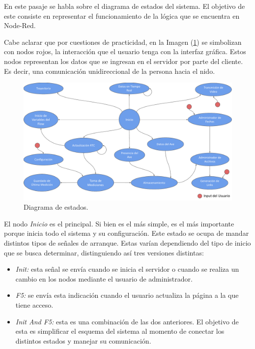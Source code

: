 En este pasaje se habla sobre el diagrama de estados del sistema. El objetivo de este consiste en representar el funcionamiento de la lógica que se encuentra en Node-Red.

Cabe aclarar que por cuestiones de practicidad, en la Imagen (\ref{fig:diagrama_de_estados}) se simbolizan con nodos rojos, la interacción que el usuario tenga con la interfaz gráfica. Estos nodos representan los datos que se ingresan en el servidor por parte del cliente. Es decir, una comunicación unidireccional de la persona hacia el nido.

\begin{figure}[H]
	\centering	
	\includegraphics[width=\textwidth, page=1]{ImagenesIngenieria de Detalle/FlowChartNodeRed.pdf}	
	\caption{Diagrama de estados.}
	\label{fig:diagrama_de_estados}
\end{figure}

El nodo \textit{Inicio} es el principal. Si bien es el más simple, es el más importante porque inicia todo el sistema y su configuración. Este estado se ocupa de mandar distintos tipos de señales de arranque. Estas varían dependiendo del tipo de inicio que se busca determinar, distinguiendo así tres versiones distintas:
\begin{itemize}
	\item \textit{Init:} esta señal se envía cuando se inicia el servidor o cuando se realiza un cambio en los nodos mediante el usuario de administrador.
	\item \textit{F5:} se envía esta indicación cuando el usuario actualiza la página a la que tiene acceso.
	\item \textit{Init And F5:} esta es una combinación de las dos anteriores. El objetivo de esta es simplificar el esquema del sistema al momento de conectar los distintos estados y manejar su comunicación.
\end{itemize}

